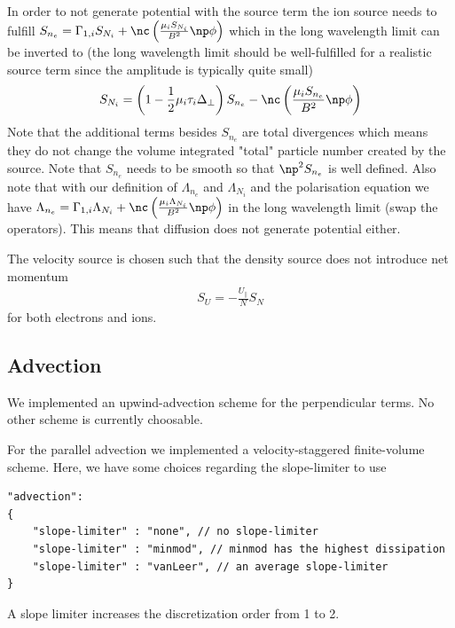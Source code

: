 In order to not generate potential with the source term the
ion source needs to fulfill $S_{n_e} = \Gamma_{1,i}S_{N_i} + \nc\left( \frac{\mu_i S_{N_i}}{B^2}\np \phi\right)$ which in the long wavelength limit can be inverted to (the long wavelength limit should be well-fulfilled for a realistic source term since the amplitude is typically quite small)
\begin{align}
    S_{N_i} = \left(1-\frac{1}{2}\mu_i \tau_i \Delta_\perp\right) S_{n_e} -\nc\left( \frac{\mu_i S_{n_e}}{B^2}\np \phi\right)
  \label{eq:ion_source}
\end{align}
Note that the additional terms besides $S_{n_e}$ are total divergences which means
they do not change the volume integrated "total" particle number created by the source.
Note that $S_{n_e}$ needs to be smooth
so that $\np^2 S_{n_e}$ is well defined.
Also note that with our definition of $\Lambda_{n_e}$ and $\Lambda_{N_i}$ and
the polarisation equation we have $\Lambda_{n_e} = \Gamma_{1,i}\Lambda_{N_i} + \nc\left( \frac{\mu_i \Lambda_{N_i}}{B^2}\np \phi\right)$ in the long wavelength limit (swap the operators).
This means that diffusion does not generate potential either.

The velocity source is chosen such that the density source does not introduce
net momentum
\begin{align}
    S_U = -\frac{U_\parallel}{N} S_N
    \label{eq:velocity_source}
\end{align}
for both electrons and ions.

\subsection{Advection}
We implemented an upwind-advection scheme for the perpendicular terms.
No other scheme is currently choosable.

For the parallel advection we implemented a velocity-staggered finite-volume
scheme. Here, we have some choices regarding the slope-limiter to use
\begin{verbatim}
"advection":
{
    "slope-limiter" : "none", // no slope-limiter
    "slope-limiter" : "minmod", // minmod has the highest dissipation
    "slope-limiter" : "vanLeer", // an average slope-limiter
}
\end{verbatim}
\begin{tcolorbox}[title=Note]
    A slope limiter increases the discretization order from 1 to 2.
\end{tcolorbox}
